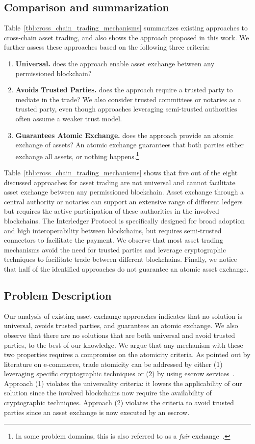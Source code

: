 \subsection{Comparison and summarization}
Table~\ref{tbl:cross_chain_trading_mechanisms} summarizes existing approaches to cross-chain asset trading, and also shows the approach proposed in this work.
We further assess these approaches based on the following three criteria:
\begin{enumerate}
	\item \textbf{Universal.} does the approach enable asset exchange between any permissioned blockchain?
	\item \textbf{Avoids Trusted Parties.} does the approach require a trusted party to mediate in the trade? We also consider trusted committees or notaries as a trusted party, even though approaches leveraging semi-trusted authorities often assume a weaker trust model.
	\item \textbf{Guarantees Atomic Exchange.} does the approach provide an atomic exchange of assets? An atomic exchange guarantees that both parties either exchange all assets, or nothing happens.\footnote{In some problem domains, this is also referred to as a \emph{fair} exchange~\cite{asokan1997optimistic}.}
\end{enumerate}

Table~\ref{tbl:cross_chain_trading_mechanisms} shows that five out of the eight discussed approaches for asset trading are not universal and cannot facilitate asset exchange between any permissioned blockchain.
Asset exchange through a central authority or notaries can support an extensive range of different ledgers but requires the active participation of these authorities in the involved blockchains.
The Interledger Protocol is specifically designed for broad adoption and high interoperability between blockchains, but requires semi-trusted connectors to facilitate the payment.
We observe that most asset trading mechanisms avoid the need for trusted parties and leverage cryptographic techniques to facilitate trade between different blockchains.
Finally, we notice that half of the identified approaches do not guarantee an atomic asset exchange.

\subsection{Problem Description}
Our analysis of existing asset exchange approaches indicates that no solution is universal, avoids trusted parties, and guarantees an atomic exchange.
We also observe that there are no solutions that are both universal and avoid trusted parties, to the best of our knowledge.
We argue that any mechanism with these two properties requires a compromise on the atomicity criteria.
As pointed out by literature on e-commerce, trade atomicity can be addressed by either (1) leveraging specific cryptographic techniques or (2) by using escrow services~\cite{ray2002fair}.
Approach (1) violates the universality criteria: it lowers the applicability of our solution since the involved blockchains now require the availability of cryptographic techniques.
Approach (2) violates the criteria to avoid trusted parties since an asset exchange is now executed by an escrow.

